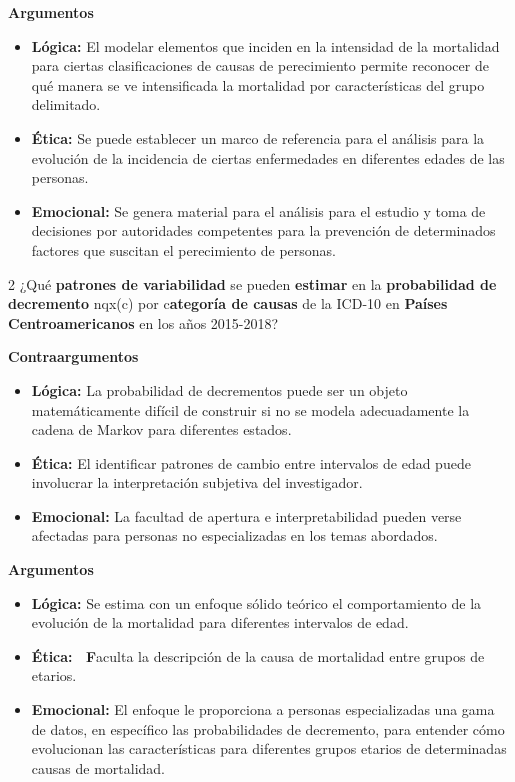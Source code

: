 \documentclass[
  letterpaper,
  DIV=11,
  numbers=noendperiod]{scrartcl}
\begin{document}
\textbf{Argumentos}

\begin{itemize}
\item
  \textbf{Lógica:} El modelar elementos que inciden en la intensidad de
  la mortalidad para ciertas clasificaciones de causas de perecimiento
  permite reconocer de qué manera se ve intensificada la mortalidad por
  características del grupo delimitado.
\item
  \textbf{Ética:} Se puede establecer un marco de referencia para el
  análisis para la evolución de la incidencia de ciertas enfermedades en
  diferentes edades de las personas.
\item
  \textbf{Emocional:} Se genera material para el análisis para el
  estudio y toma de decisiones por autoridades competentes para la
  prevención de determinados factores que suscitan el perecimiento de
  personas.
\end{itemize}

2 ¿Qué \textbf{patrones de variabilidad} se pueden \textbf{estimar} en
la \textbf{probabilidad de decremento} nqx(c) por c\textbf{ategoría de
causas} de la ICD-10 en \textbf{Países Centroamericanos} en los años
2015-2018?

\textbf{Contraargumentos}

\begin{itemize}
\item
  \textbf{Lógica:} La probabilidad de decrementos puede ser un objeto
  matemáticamente difícil de construir si no se modela adecuadamente la
  cadena de Markov para diferentes estados.
\item
  \textbf{Ética:} El identificar patrones de cambio entre intervalos de
  edad puede involucrar la interpretación subjetiva del investigador.
\item
  \textbf{Emocional:} La facultad de apertura e interpretabilidad pueden
  verse afectadas para personas no especializadas en los temas
  abordados.~
\end{itemize}

\textbf{Argumentos}

\begin{itemize}
\item
  \textbf{Lógica:} Se estima con un enfoque sólido teórico el
  comportamiento de la evolución de la mortalidad para diferentes
  intervalos de edad.
\item
  \textbf{Ética: ~F}aculta la descripción de la causa de mortalidad
  entre grupos de etarios.
\item
  \textbf{Emocional:} El enfoque le proporciona a personas
  especializadas una gama de datos, en específico las probabilidades de
  decremento, para entender cómo evolucionan las características para
  diferentes grupos etarios de determinadas causas de mortalidad.
\end{itemize}
\end{document}

